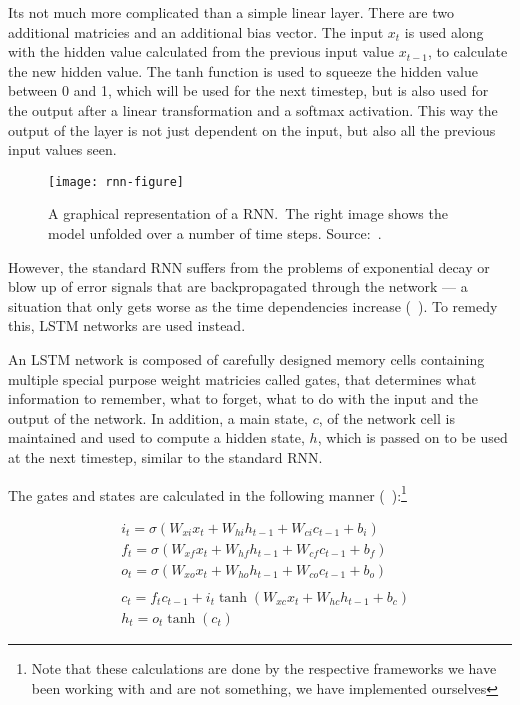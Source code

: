 Its not much more complicated than a simple linear layer. There are two
additional matricies and an additional bias vector. The input $x_t$ is used
along with the hidden value calculated from the previous input value $x_{t-1}$,
to calculate the new hidden value. The tanh function is used to squeeze the
hidden value between 0 and 1, which will be used for the next timestep, but is
also used for the output after a linear transformation and a softmax activation.
This way the output of the layer is not just dependent on the input, but also
all the previous input values seen.

\begin{figure}[h]
    \texttt{[image: rnn-figure]}
    \caption{A graphical representation of a RNN.\ The right image shows the
    model unfolded over a number of time steps. Source:~\cite{olah2015lstm}.
    }\label{fig:rnn}
\end{figure}

However, the standard RNN suffers from the problems of exponential decay or blow
up of error signals that are backpropagated through the network --- a situation
that only gets worse as the time dependencies increase
(~\cite{hochreiter2001gradient}). To remedy this, LSTM networks are used instead.

An LSTM network is composed of carefully designed memory cells containing
multiple special purpose weight matricies called gates, that determines what
information to remember, what to forget, what to do with the input and the
output of the network. In addition, a main state, $c$, of the network cell is
maintained and used to compute a hidden state, $h$, which is passed on to be
used at the next timestep, similar to the standard RNN.

The gates and states are calculated in the following manner
(~\cite{huang2015bidirectional}):\footnote{Note that
    these calculations are done by the respective frameworks we have been
working with and are not something, we have implemented ourselves}


\begin{align*}
    & i_{t} = \sigma(W_{xi}x_{t} + W_{hi}h_{t-1} + W_{ci}c_{t-1} + b_{i})    \\
    & f_{t} = \sigma(W_{xf}x_{t} + W_{hf}h_{t-1} + W_{cf}c_{t-1} + b_{f})    \\
    & o_{t} = \sigma(W_{xo}x_{t} + W_{ho}h_{t-1} + W_{co}c_{t-1} + b_{o})    \\ \\
    & c_{t} = f_{t}c_{t-1} + i_{t}\tanh(W_{xc}x_{t} + W_{hc}h_{t-1} + b_{c}) \\
    & h_{t} = o_{t}\tanh(c_{t})
\end{align*}

